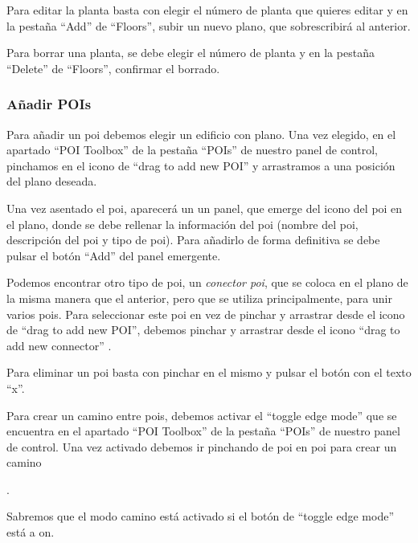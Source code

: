 Para editar la planta basta con elegir el número de planta que quieres editar y en la pestaña ``Add'' de ``Floors'', subir un nuevo plano, que sobrescribirá al anterior.

Para borrar una planta, se debe elegir el número de planta y en la pestaña ``Delete'' de ``Floors'', confirmar el borrado.

\subsubsection{Añadir POIs}

Para añadir un poi debemos elegir un edificio con plano. Una vez elegido, en el apartado ``POI Toolbox'' de la pestaña ``POIs'' de nuestro panel de control, pinchamos en el icono de ``drag to add new POI'' y arrastramos a una posición del plano deseada.


Una vez asentado el poi, aparecerá un un panel, que emerge del icono del poi en el plano, donde se debe rellenar la información del poi (nombre del poi, descripción del poi y tipo de poi). Para añadirlo de forma definitiva se debe pulsar el botón ``Add'' del panel emergente.
\newpage
{}

Podemos encontrar otro tipo de poi, un \textit{conector poi}, que se coloca en el plano de la misma manera que el anterior, pero que se utiliza principalmente, para unir varios pois. Para seleccionar este poi en vez de pinchar y arrastrar desde el icono de ``drag to add new POI'', debemos pinchar y arrastrar desde el icono ``drag to add new connector'' .


Para eliminar un poi basta con pinchar en el mismo y pulsar el botón con el texto ``x''.

Para crear un camino entre pois, debemos activar el ``toggle edge mode'' que se encuentra en el apartado ``POI Toolbox'' de la pestaña ``POIs'' de nuestro panel de control. Una vez activado debemos ir pinchando de poi en poi para crear un camino

.

Sabremos que el modo camino está activado si el botón de ``toggle edge mode'' está a on.  

